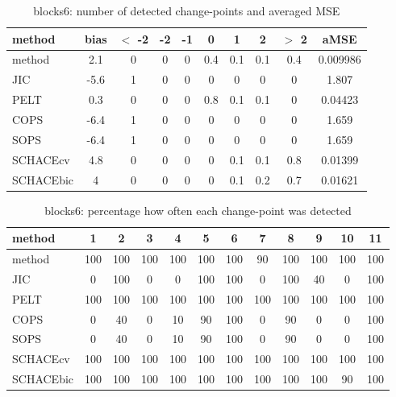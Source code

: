 \begin{table}[ht]
\centering
\begin{tabular}{l|c|ccccccc|c}
  \hline
method & bias & $<$ -2 & -2 & -1 & 0 & 1 & 2 & $>$ 2 & aMSE \\ 
  \hline
method &   2.1 &     0 &     0 &     0 &   0.4 &   0.1 &   0.1 &   0.4 & 0.009986 \\ 
  JIC &  -5.6 &     1 &     0 &     0 &     0 &     0 &     0 &     0 & 1.807 \\ 
  PELT &   0.3 &     0 &     0 &     0 &   0.8 &   0.1 &   0.1 &     0 & 0.04423 \\ 
  COPS &  -6.4 &     1 &     0 &     0 &     0 &     0 &     0 &     0 & 1.659 \\ 
  SOPS &  -6.4 &     1 &     0 &     0 &     0 &     0 &     0 &     0 & 1.659 \\ 
  SCHACEcv &   4.8 &     0 &     0 &     0 &     0 &   0.1 &   0.1 &   0.8 & 0.01399 \\ 
  SCHACEbic &     4 &     0 &     0 &     0 &     0 &   0.1 &   0.2 &   0.7 & 0.01621 \\ 
   \hline
\end{tabular}
\caption{blocks6: number of detected change-points and averaged MSE} 
\label{tab:blocks6Njumps}
\end{table}
\begin{table}[ht]
\centering
\begin{tabular}{l|ccccccccccc}
  \hline
method & 1 & 2 & 3 & 4 & 5 & 6 & 7 & 8 & 9 & 10 & 11 \\ 
  \hline
method &    100 &    100 &    100 &    100 &    100 &    100 &     90 &    100 &    100 &    100 &    100 \\ 
  JIC &      0 &    100 &      0 &      0 &    100 &    100 &      0 &    100 &     40 &      0 &    100 \\ 
  PELT &    100 &    100 &    100 &    100 &    100 &    100 &    100 &    100 &    100 &    100 &    100 \\ 
  COPS &      0 &     40 &      0 &     10 &     90 &    100 &      0 &     90 &      0 &      0 &    100 \\ 
  SOPS &      0 &     40 &      0 &     10 &     90 &    100 &      0 &     90 &      0 &      0 &    100 \\ 
  SCHACEcv &    100 &    100 &    100 &    100 &    100 &    100 &    100 &    100 &    100 &    100 &    100 \\ 
  SCHACEbic &    100 &    100 &    100 &    100 &    100 &    100 &    100 &    100 &    100 &     90 &    100 \\ 
   \hline
\end{tabular}
\caption{blocks6: percentage how often each change-point was detected} 
\label{tab:blocks6Detections}
\end{table}
